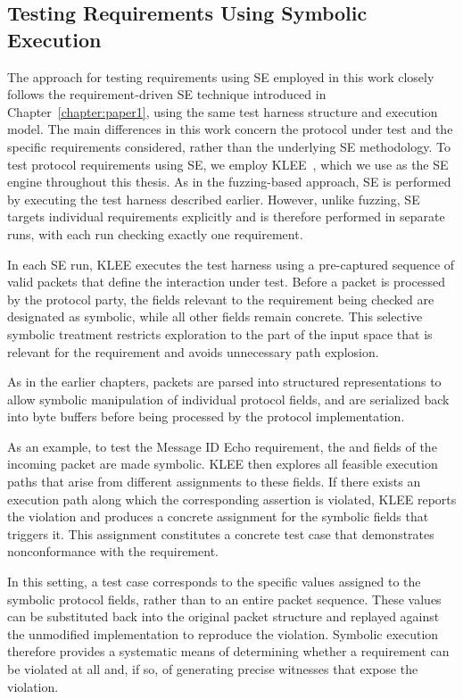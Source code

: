 \subsection{Testing Requirements Using Symbolic Execution}
The approach for testing requirements using SE employed in this work closely follows the requirement-driven SE technique introduced in Chapter~\ref{chapter:paper1}, using the same test harness structure and execution model.
The main differences in this work concern the protocol under test and the specific requirements considered, rather than the underlying SE methodology.
To test protocol requirements using SE, we employ KLEE~\cite{KLEE@OSDI-08}, which we use as the SE engine throughout this thesis.
As in the fuzzing-based approach, SE is performed by executing the test harness described earlier.
However, unlike fuzzing, SE targets individual requirements explicitly and is therefore performed in separate runs, with each run checking exactly one requirement.

In each SE run, KLEE executes the test harness using a pre-captured sequence of valid packets that define the interaction under test.
Before a packet is processed by the protocol party, the fields relevant to the requirement being checked are designated as symbolic, while all other fields remain concrete.
This selective symbolic treatment restricts exploration to the part of the input space that is relevant for the requirement and avoids unnecessary path explosion.

As in the earlier chapters, packets are parsed into structured representations to allow symbolic manipulation of individual protocol fields, and are serialized back into byte buffers before being processed by the protocol implementation.

As an example, to test the Message ID Echo requirement, the  and  fields of the incoming packet are made symbolic.
KLEE then explores all feasible execution paths that arise from different assignments to these fields.
If there exists an execution path along which the corresponding assertion is violated, KLEE reports the violation and produces a concrete assignment for the symbolic fields that triggers it.
This assignment constitutes a concrete test case that demonstrates nonconformance with the requirement.

In this setting, a test case corresponds to the specific values assigned to the symbolic protocol fields, rather than to an entire packet sequence.
These values can be substituted back into the original packet structure and replayed against the unmodified implementation to reproduce the violation.
Symbolic execution therefore provides a systematic means of determining whether a requirement can be violated at all and, if so, of generating precise witnesses that expose the violation.


